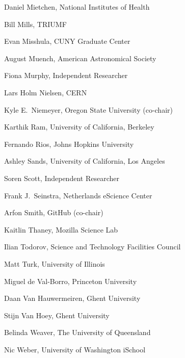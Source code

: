 \documentclass[11pt, oneside]{amsart}
\begin{document}
Daniel Mietchen, National Institutes of Health

Bill Mills, TRIUMF

Evan Misshula, CUNY Graduate Center

August Muench, American Astronomical Society

Fiona Murphy, Independent Researcher

Lars Holm Nielsen, CERN

Kyle E.~Niemeyer, Oregon State University (co-chair)

Karthik Ram, University of California, Berkeley

Fernando Rios, Johns Hopkins University

Ashley Sands, University of California, Los Angeles

Soren Scott, Independent Researcher

Frank J.~Seinstra, Netherlands eScience Center

Arfon Smith, GitHub (co-chair)

Kaitlin Thaney, Mozilla Science Lab

Ilian Todorov, Science and Technology Facilities Council

Matt Turk, University of Illinois

Miguel de Val-Borro, Princeton University

Daan Van Hauwermeiren, Ghent University

Stijn Van Hoey, Ghent University

Belinda Weaver, The University of Queensland

Nic Weber, University of Washington iSchool



\end{document}
